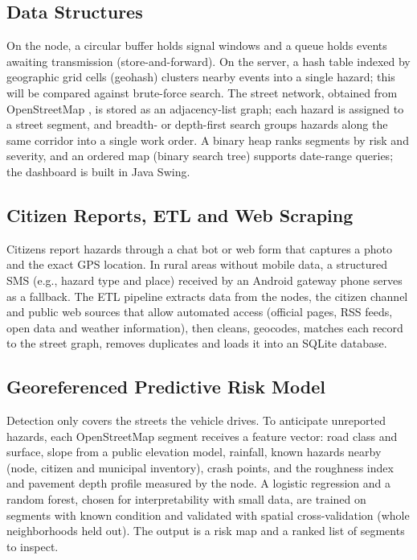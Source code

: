 \documentclass[journal,10pt]{IEEEtran}
\begin{document}
\subsection{Data Structures}
On the node, a circular buffer holds signal windows and a queue holds events awaiting transmission (store-and-forward). On the server, a hash table indexed by geographic grid cells (geohash) clusters nearby events into a single hazard; this will be compared against brute-force search. The street network, obtained from OpenStreetMap \cite{boeing2017osmnx}, is stored as an adjacency-list graph; each hazard is assigned to a street segment, and breadth- or depth-first search groups hazards along the same corridor into a single work order. A binary heap ranks segments by risk and severity, and an ordered map (binary search tree) supports date-range queries; the dashboard is built in Java Swing.

\subsection{Citizen Reports, ETL and Web Scraping}
Citizens report hazards through a chat bot or web form that captures a photo and the exact GPS location. In rural areas without mobile data, a structured SMS (e.g., hazard type and place) received by an Android gateway phone serves as a fallback. The ETL pipeline extracts data from the nodes, the citizen channel and public web sources that allow automated access (official pages, RSS feeds, open data and weather information), then cleans, geocodes, matches each record to the street graph, removes duplicates and loads it into an SQLite database.

\subsection{Georeferenced Predictive Risk Model}
Detection only covers the streets the vehicle drives. To anticipate unreported hazards, each OpenStreetMap segment receives a feature vector: road class and surface, slope from a public elevation model, rainfall, known hazards nearby (node, citizen and municipal inventory), crash points, and the roughness index and pavement depth profile measured by the node. A logistic regression and a random forest, chosen for interpretability with small data, are trained on segments with known condition and validated with spatial cross-validation (whole neighborhoods held out). The output is a risk map and a ranked list of segments to inspect.
\end{document}
